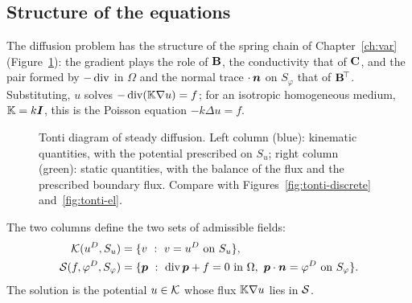 \subsection{Structure of the equations}
%
The diffusion problem has the structure of the spring chain of
Chapter~\ref{ch:var} (Figure~\ref{fig:tonti-diff}): the gradient plays the
role of $\mathbf{B}$, the conductivity that of $\mathbf{C}$, and the pair formed by
$-\operatorname{div}$ in $\Omega$ and the normal trace $\cdot\,\bm{n}$ on $S_\varphi$ that of
$\mathbf{B}^{\!\top}$. Substituting, $u$ solves $-\operatorname{div}(\mathbb{K}\nabla u)=f$; for an isotropic
homogeneous medium, $\mathbb{K}=k\bm{I}$, this is the Poisson equation $-k\Delta u=f$.
\begin{figure}[h]
\centering
{}
\caption{Tonti diagram of steady diffusion. Left column (blue): kinematic
quantities, with the potential prescribed on $S_u$; right column (green):
static quantities, with the balance of the flux and the prescribed boundary
flux. Compare with Figures~\ref{fig:tonti-discrete} and~\ref{fig:tonti-el}.}
\label{fig:tonti-diff}
\end{figure}
The two columns define the two sets of admissible fields:
\begin{align*}
  \Kad(\uD,S_u)&=\{v\ :\ v=\uD\ \text{on }S_u\},\\
  \Sad(f,\pD,S_\varphi)&=\{\vp\ :\ \dive\vp+f=0\ \text{in }\Omega,\ \vp\cdot\vn=\pD\ \text{on }S_\varphi\}.
\end{align*}
The solution is the potential $u\in\mathcal{K}$ whose flux $\mathbb{K}\nabla u$ lies in
$\mathcal{S}$.

